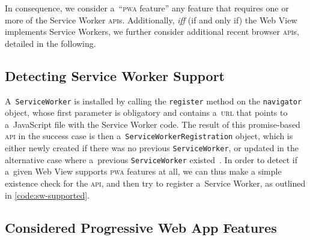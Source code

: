 \documentclass[sigconf]{acmart}
\begin{document}
In consequence, we consider a~``\textsc{pwa} feature''
any feature that requires  one or more of the Service Worker \textsc{api}s.
Additionally, \emph{iff} (if and only if) the Web View implements Service Workers,
we further consider additional recent browser \textsc{api}s,
detailed in the following.

\subsection{Detecting Service Worker Support}

A~\texttt{ServiceWorker} is installed by calling the \texttt{register} method
on the \texttt{navigator} object, whose first parameter is obligatory
and contains a~\textsc{url} that points to a~JavaScript file with the Service Worker code.
The result of this promise-based \textsc{api} in the success case is then
a~\texttt{ServiceWorkerRegistration} object,
which is either newly created if there was no previous \texttt{ServiceWorker},
or updated in the alternative case
where a~previous \texttt{ServiceWorker} existed~\cite{russell2017serviceworkers}.
In order to detect if a~given Web View supports \textsc{pwa} features at all,
we can thus make a simple existence check for the \textsc{api},
and then try to register a~Service Worker, as outlined in \autoref{code:sw-supported}.

\subsection{Considered Progressive Web App Features}
\end{document}
